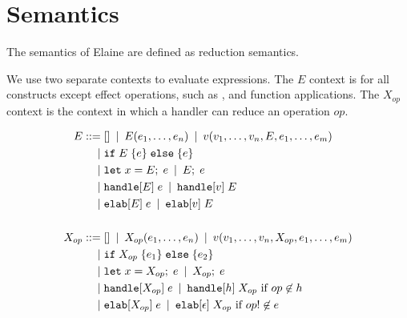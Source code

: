 \section{Semantics}\label{sec:semantics}

The semantics of Elaine are defined as reduction semantics.

We use two separate contexts to evaluate expressions. The $E$ context is for all constructs except effect operations, such as ,  and function applications. The $X_{op}$ context is the context in which a handler can reduce an operation $op$.

\begin{align*}
    E
        \mathbin{\;::=\;} & [] \mathbin{\;|\;} E(e_1,\dots, e_n) \mathbin{\;|\;} v(v_1,\dots,v_n,E,e_1,\dots,e_m) \\
        \mathbin{\;|\;} & \text{\texttt{if}}\;E\;\{e\}\;\text{\texttt{else}}\;\{e\}\; \\
        \mathbin{\;|\;} & \text{\texttt{let}}\;x = E;\;e \mathbin{\;|\;} E;\;e\\
        \mathbin{\;|\;} & \text{\texttt{handle}}[E]\;e \mathbin{\;|\;} \text{\texttt{handle}}[v]\;E \\
        \mathbin{\;|\;} & \text{\texttt{elab}}[E]\;e \mathbin{\;|\;} \text{\texttt{elab}}[v]\;E\\
    \\
    X_{op}
        \mathbin{\;::=\;} & [] \mathbin{\;|\;} X_{op}(e_1, \dots, e_n) \mathbin{\;|\;} v(v_1, \dots, v_n, X_{op}, e_1, \dots, e_m) \\
        \mathbin{\;|\;} & \text{\texttt{if}}\;X_{op}\;\{e_1\}\;\text{\texttt{else}}\;\{e_2\}\; \\
        \mathbin{\;|\;} & \text{\texttt{let}}\;x = X_{op};\;e \mathbin{\;|\;} X_{op};\;e \\
        \mathbin{\;|\;} & \text{\texttt{handle}}[X_{op}]\;e \mathbin{\;|\;} \text{\texttt{handle}}[h]\;{X_{op}} \text{ if } op\not\in h \\
        \mathbin{\;|\;} & \text{\texttt{elab}}[X_{op}]\;e \mathbin{\;|\;} \text{\texttt{elab}}[\epsilon]\;X_{op} \text{ if } op! \not\in e
\end{align*}


